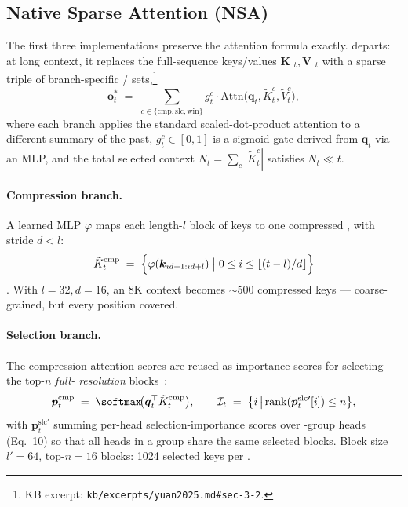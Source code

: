 \subsection{Native Sparse Attention (NSA)}
\label{sec:nsa}

The first three implementations preserve the attention formula
exactly.  \citep{yuan2025} departs: at long context, it replaces
the full-sequence keys/values $\boldsymbol{K}_{:t}, \boldsymbol{V}_{:t}$
with a sparse triple of branch-specific /
sets,\footnote{KB excerpt: \nolinkurl{kb/excerpts/yuan2025.md#sec-3-2}.}
\begin{equation}
  \boldsymbol{o}_t^* \;=\; \sum_{c \in \{\mathrm{cmp}, \mathrm{slc}, \mathrm{win}\}}
                          g_t^c \cdot \mathrm{Attn}\!\bigl(\boldsymbol{q}_t,
                                                        \tilde K_t^c,
                                                        \tilde V_t^c\bigr),
  \label{eq:nsa-three-branch}
\end{equation}
where each branch applies the standard scaled-dot-product attention to
a different summary of the past, $g_t^c \in [0, 1]$ is a sigmoid gate
derived from $\boldsymbol{q}_t$ via an MLP, and the total selected
context $N_t = \sum_c |\tilde K_t^c|$ satisfies $N_t \ll t$.

\paragraph{Compression branch.} A learned MLP $\varphi$ maps each
length-$l$ block of keys to one compressed , with stride $d < l$:
\begin{equation}
  \tilde K_t^{\mathrm{cmp}} \;=\;
    \Bigl\{\varphi(\boldsymbol{k}_{i d + 1 : i d + l})
      \;\big|\; 0 \le i \le \lfloor (t - l) / d \rfloor\Bigr\}
  \label{eq:nsa-cmp}
\end{equation}
\citep[\S 3.3.1]{yuan2025}. With $l = 32, d = 16$, an 8K context
becomes $\sim\!500$ compressed keys --- coarse-grained, but every
position covered.

\paragraph{Selection branch.} The compression-attention scores are
reused as importance scores for selecting the top-$n$ \emph{full-
resolution} blocks~\citep[\S 3.3.2 Eq.~8--12]{yuan2025}:
\begin{equation}
  \boldsymbol{p}_t^{\mathrm{cmp}} \;=\; \softmax\!\bigl(\boldsymbol{q}_t^\top \tilde K_t^{\mathrm{cmp}}\bigr),
  \qquad
  \mathcal{I}_t \;=\; \bigl\{i \,\big|\, \mathrm{rank}(\boldsymbol{p}_t^{\mathrm{slc}\prime}[i]) \le n\bigr\},
  \label{eq:nsa-select}
\end{equation}
with $\boldsymbol{p}_t^{\mathrm{slc}\prime}$ summing per-head
selection-importance scores over -group heads (Eq.~10) so that all
heads in a  group share the same selected blocks. Block size
$l' = 64$, top-$n = 16$ blocks: 1024 selected keys per .

